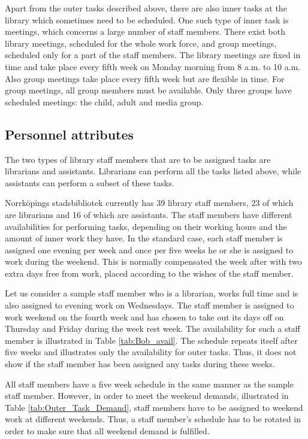 Apart from the outer tasks described above, there are also inner tasks at the library which sometimes need to be scheduled. One such type of inner task is meetings, which concerns a large number of staff members. There exist both library meetings, scheduled for the whole work force, and group meetings, scheduled only for a part of the staff members. The library meetings are fixed in time and take place every fifth week on Monday morning from 8 a.m. to 10 a.m. Also group meetings take place every fifth week but are flexible in time. For group meetings, all group members must be available. Only three groups have scheduled meetings: the child, adult and media group.

\subsection{Personnel attributes}

The two types of library staff members that are to be assigned tasks are librarians and assistants. Librarians can perform all the tasks listed above, while assistants can perform a subset of these tasks.

Norrköpings stadsbibliotek currently has 39 library staff members, 23 of which are librarians and 16 of which are assistants. The staff members have different availabilities for performing tasks, depending on their working hours and the amount of inner work they have. In the standard case, each staff member is assigned one evening per week and once per five weeks he or she is assigned to work during the weekend. This is normally compensated the week after with two extra days free from work, placed according to the wishes of the staff member.

Let us consider a sample staff member who is a librarian, works full time and is also assigned to evening work on Wednesdays. The staff member is assigned to work weekend on the fourth week and has chosen to take out its days off on Thursday and Friday during the week rest week. The availability for such a staff member is illustrated in Table \ref{tab:Bob_avail}. The schedule repeats itself after five weeks and illustrates only the availability for outer tasks. Thus, it does not show if the staff member has been assigned any tasks during these weeks.

All staff members have a five week schedule in the same manner as the sample staff member. However, in order to meet the weekend demands, illustrated in Table \ref{tab:Outer_Task_Demand}, staff members have to be assigned to weekend work at different weekends. Thus, a staff member's schedule has to be rotated in order to make sure that all weekend demand is fulfilled.

